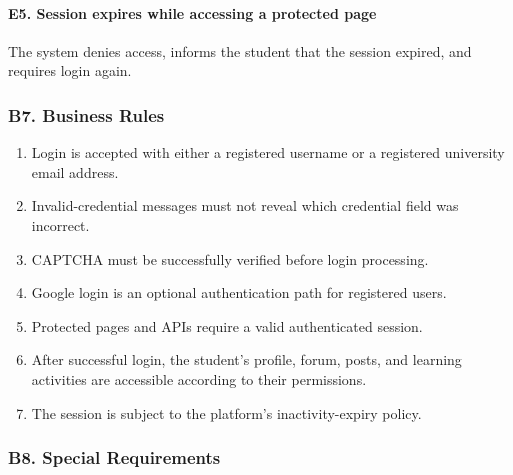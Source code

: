\documentclass[12pt]{article}
\begin{document}
\hypertarget{sec:e5-session-expires-while-accessing-a-protected-page}{}
\paragraph*{E5. Session expires while accessing a protected page}
\par\medskip

The system denies access, informs the student that the session expired, and requires login again.
\par\medskip

\hypertarget{sec:b7-business-rules}{}
\subsubsection*{B7. Business Rules}
\par\medskip

\begin{enumerate}
\item Login is accepted with either a registered username or a registered university email address.
\item Invalid-credential messages must not reveal which credential field was incorrect.
\item CAPTCHA must be successfully verified before login processing.
\item Google login is an optional authentication path for registered users.
\item Protected pages and APIs require a valid authenticated session.
\item After successful login, the student's profile, forum, posts, and learning activities are accessible according to their permissions.
\item The session is subject to the platform's inactivity-expiry policy.
\end{enumerate}
\par\medskip

\hypertarget{sec:b8-special-requirements}{}
\subsubsection*{B8. Special Requirements}
\par\medskip
\end{document}
